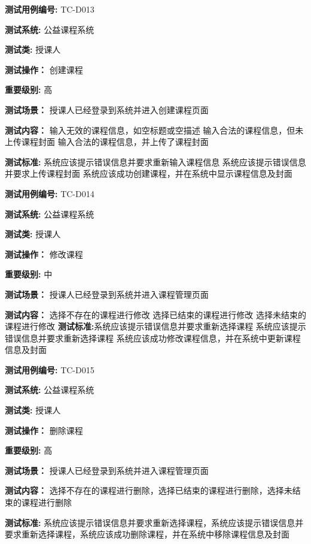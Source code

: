  \begin{framed} \textbf{测试用例编号:} TC-D013

\textbf{测试系统:} 公益课程系统

\textbf{测试类: } 授课人

\textbf{测试操作：} 创建课程

\textbf{重要级别:} 高

\textbf{测试场景：} 授课人已经登录到系统并进入创建课程页面

\textbf{测试内容：} 输入无效的课程信息，如空标题或空描述 输入合法的课程信息，但未上传课程封面 输入合法的课程信息，并上传了课程封面

\textbf{测试标准:} 系统应该提示错误信息并要求重新输入课程信息 系统应该提示错误信息并要求上传课程封面 系统应该成功创建课程，并在系统中显示课程信息及封面

\begin{center}  \end{center} \end{framed}

\begin{framed} \textbf{测试用例编号:} TC-D014

\textbf{测试系统:} 公益课程系统

\textbf{测试类: } 授课人

\textbf{测试操作：} 修改课程

\textbf{重要级别:} 中

\textbf{测试场景：} 授课人已经登录到系统并进入课程管理页面

\textbf{测试内容：}  选择不存在的课程进行修改 选择已结束的课程进行修改 选择未结束的课程进行修改
\textbf{测试标准:}系统应该提示错误信息并要求重新选择课程 系统应该提示错误信息并要求重新选择课程 系统应该成功修改课程信息，并在系统中更新课程信息及封面

\begin{center}  \end{center} \end{framed}

\begin{framed} \textbf{测试用例编号:} TC-D015

\textbf{测试系统:} 公益课程系统

\textbf{测试类: } 授课人

\textbf{测试操作：} 删除课程

\textbf{重要级别:} 高

\textbf{测试场景：} 授课人已经登录到系统并进入课程管理页面

\textbf{测试内容：} 选择不存在的课程进行删除，选择已结束的课程进行删除，选择未结束的课程进行删除

\textbf{测试标准:} 系统应该提示错误信息并要求重新选择课程，系统应该提示错误信息并要求重新选择课程，系统应该成功删除课程，并在系统中移除课程信息及封面 

\begin{center}  \end{center} \end{framed}
